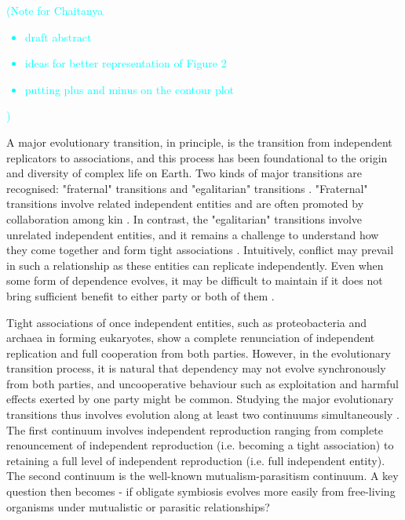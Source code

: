 \documentclass[11pt]{article}
\newcommand{\pn}[1]{\textcolor{cyan}{(#1)}}
\begin{document}

\pn{Note for Chaitanya
\begin{itemize}
	\item draft abstract
	\item ideas for better representation of Figure 2
	\item putting plus and minus on the contour plot
	\end{itemize}}

A major evolutionary transition, in principle, is the transition from independent replicators to associations, and this process has been foundational to the origin and diversity of complex life on Earth.
Two kinds of major transitions are recognised: "fraternal" transitions and "egalitarian" transitions \citep{queller:PTRSB:2000} . 
"Fraternal" transitions involve related independent entities and are often promoted by collaboration among kin \citep{nowak:Nature:2010}.
In contrast, the "egalitarian" transitions involve unrelated independent entities, and it remains a challenge to understand how they come together and form tight associations \citep{tarnita:JTB:2013}.
Intuitively, conflict may prevail in such a relationship as these entities can replicate independently.
Even when some form of dependence evolves, it may be difficult to maintain if it does not bring sufficient benefit to either party or both of them \citep{athreya:AmNat:2025}.

Tight associations of once independent entities, such as proteobacteria and archaea in forming eukaryotes, show a complete renunciation of independent replication and full cooperation from both parties.
However, in the evolutionary transition process, it is natural that dependency may not evolve synchronously from both parties, and uncooperative behaviour such as exploitation and harmful effects exerted by one party might be common.
Studying the major evolutionary transitions thus involves evolution along at least two continuums simultaneously \citep{estrela:COM:2016} . 
The first continuum involves independent reproduction ranging from complete renouncement of independent reproduction (i.e. becoming a tight association) to retaining a full level of independent reproduction (i.e. full independent entity).
The second continuum is the well-known mutualism-parasitism continuum.
A key question then becomes - if obligate symbiosis evolves more easily from free-living organisms under mutualistic or parasitic relationships? 
\end{document}
